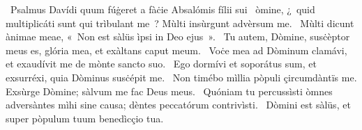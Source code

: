 {~Psalmus Davídi quum fúġeret a fàċie Absalómis fílii sui}
{%
~òmine, ¿~quid multiplicáti sunt qui trìbulant me~? Mùlti insùrgunt advèrsum me.
~Mùlti dicunt ànimae meae, «~Non est sàlüs ìpsi in Deo ejus~».
~Tu autem, Dòmine, susċèptor meus es, glória mea, et exàltans caput meum.
~Voċe mea ad Dòminum clamávi, et exaudívit me de mònte sancto suo.
~Ego dormívi et soporátus sum, et exsurréxi, quia Dòminus susċépit me.
~Non timébo mìllia pòpuli çircumdàntïs me. Exsùrge Dòmine; sàlvum me fac Deus meus.
~Quóniam tu percussìsti òmnes adversàntes mìhi sine causa; dèntes peccatórum contrivìsti.
~Dòmini est sàlüs, et super pòpulum tuum benedìcçio tua.
}
